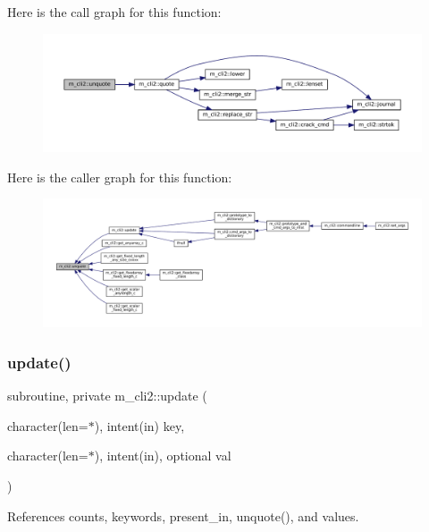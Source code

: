 Here is the call graph for this function\+:\nopagebreak
\begin{figure}[H]
\begin{center}
\leavevmode
\includegraphics[width=350pt]{namespacem__cli2_a9cab7352414f8b5625330a9ff5cf0cb4_cgraph}
\end{center}
\end{figure}
Here is the caller graph for this function\+:\nopagebreak
\begin{figure}[H]
\begin{center}
\leavevmode
\includegraphics[width=350pt]{namespacem__cli2_a9cab7352414f8b5625330a9ff5cf0cb4_icgraph}
\end{center}
\end{figure}
\mbox{\label{namespacem__cli2_a160d56bc4a10faef7e8a8a4f04f4dadb}} 
\subsubsection{\texorpdfstring{update()}{update()}}
{\footnotesize\ttfamily subroutine, private m\+\_\+cli2\+::update (\begin{DoxyParamCaption}\item[{character(len=$\ast$), intent(in)}]{key,  }\item[{character(len=$\ast$), intent(in), optional}]{val }\end{DoxyParamCaption})\hspace{0.3cm}{\ttfamily [private]}}



References counts, keywords, present\+\_\+in, unquote(), and values.

